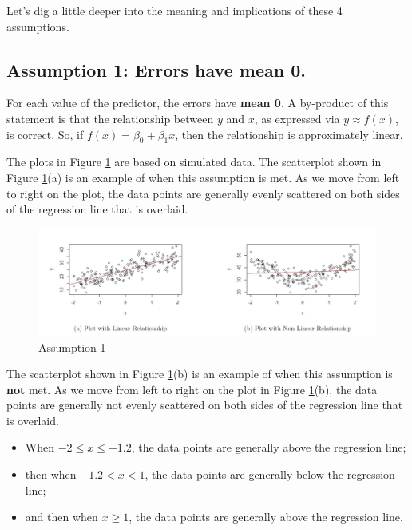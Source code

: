 \documentclass[
]{book}
\providecommand{\tightlist}{%
  \setlength{\itemsep}{0pt}\setlength{\parskip}{0pt}}
\begin{document}
Let's dig a little deeper into the meaning and implications of these 4 assumptions.

\hypertarget{assumption-1-errors-have-mean-0.}{%
\subsection{Assumption 1: Errors have mean 0.}\label{assumption-1-errors-have-mean-0.}}

For each value of the predictor, the errors have \textbf{mean 0}. A by-product of this statement is that the relationship between \(y\) and \(x\), as expressed via \(y \approx f(x)\), is correct. So, if \(f(x) = \beta_0 + \beta_1 x\), then the relationship is approximately linear.

The plots in Figure \ref{fig:ass1} are based on simulated data. The scatterplot shown in Figure \ref{fig:ass1}(a) is an example of when this assumption is met. As we move from left to right on the plot, the data points are generally evenly scattered on both sides of the regression line that is overlaid.

\begin{figure}
\centering
\includegraphics{images/ass1.jpg}
\caption{\label{fig:ass1}Assumption 1}
\end{figure}

The scatterplot shown in Figure \ref{fig:ass1}(b) is an example of when this assumption is \textbf{not} met. As we move from left to right on the plot in Figure \ref{fig:ass1}(b), the data points are generally not evenly scattered on both sides of the regression line that is overlaid.

\begin{itemize}
\tightlist
\item
  When \(-2 \leq x \leq -1.2\), the data points are generally above the regression line;
\item
  then when \(-1.2 < x < 1\), the data points are generally below the regression line;
\item
  and then when \(x \geq 1\), the data points are generally above the regression line.
\end{itemize}
\end{document}
